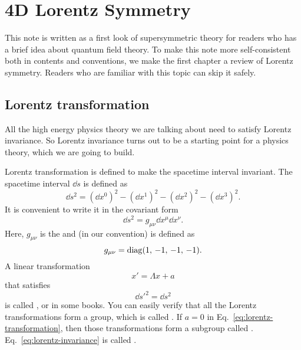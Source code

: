 \chapter{4D Lorentz Symmetry}

This note is written as a first look of supersymmetric theory for readers who has a brief idea
about quantum field theory. To make this note more self-consistent both in contents and conventions,
we make the first chapter a review of Lorentz symmetry. Readers who are familiar with this topic
can skip it safely.

\section{Lorentz transformation}

All the high energy physics theory we are talking about need to satisfy Lorentz invariance. So
Lorentz invariance turns out to be a starting point for a physics theory, which we are going to
build.

Lorentz transformation is defined to make the spacetime interval invariant. The spacetime interval
$\dd{s}$ is defined as
\begin{equation}
  \dd{s}^2 = (\dd{x}^0)^2-(\dd{x}^1)^2-(\dd{x}^2)^2-(\dd{x}^3)^2.
\end{equation}
It is convenient to write it in the covariant form
\begin{equation}
  \dd{s}^2 = g_{\mu\nu}\dd{x}^{\mu}\dd{x}^{\nu}.
\end{equation}
Here, $g_{\mu\nu}$ is the  and (in our convention) is defined as
\begin{equation}
  g_{\mu\nu} = \operatorname{diag}(1, \, -1, \, -1, \, -1).
\end{equation}
A linear transformation
\begin{equation} \label{eq:lorentz-transformation}
  x' = \Lambda x + a
\end{equation}
that satisfies
\begin{equation} \label{eq:lorentz-invariance}
  \dd{s}'^2 = \dd{s}^2
\end{equation}
is called , or  in some books. You can
easily verify that all the Lorentz transformations form a group, which is called
. If $a=0$ in Eq.~\eqref{eq:lorentz-transformation}, then those transformations
form a subgroup called . Eq.~\eqref{eq:lorentz-invariance} is called
.

